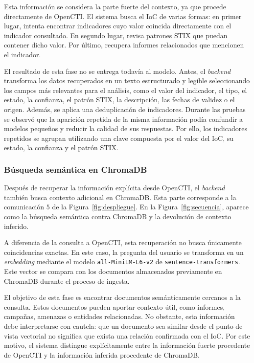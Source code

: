 \documentclass[12pt]{report}
\begin{document}
Esta información se considera la parte fuerte del contexto, ya que procede directamente de OpenCTI. El sistema busca el IoC de varias formas: en primer lugar, intenta encontrar indicadores cuyo valor coincida directamente con el indicador consultado. En segundo lugar, revisa patrones STIX que puedan contener dicho valor. Por último, recupera informes relacionados que mencionen el indicador.

El resultado de esta fase no se entrega todavía al modelo. Antes, el \textit{backend} transforma los datos recuperados en un texto estructurado y legible seleccionando los campos más relevantes para el análisis, como el valor del indicador, el tipo, el estado, la confianza, el patrón STIX, la descripción, las fechas de validez o el origen. Además, se aplica una deduplicación de indicadores. Durante las pruebas se observó que la aparición repetida de la misma información podía confundir a modelos pequeños y reducir la calidad de sus respuestas. Por ello, los indicadores repetidos se agrupan utilizando una clave compuesta por el valor del IoC, su estado, la confianza y el patrón STIX.

\subsubsection*{Búsqueda semántica en ChromaDB}

Después de recuperar la información explícita desde OpenCTI, el \textit{backend} también busca contexto adicional en ChromaDB. Esta parte corresponde a la comunicación $5$ de la Figura~\ref{fig:despliegue}. En la Figura~\ref{fig:secuencia}, aparece como la búsqueda semántica contra ChromaDB y la devolución de contexto inferido.

A diferencia de la consulta a OpenCTI, esta recuperación no busca únicamente coincidencias exactas. En este caso, la pregunta del usuario se transforma en un \textit{embedding} mediante el modelo \texttt{all-MiniLM-L6-v2} de \texttt{sentence-transformers}. Este vector se compara con los documentos almacenados previamente en ChromaDB durante el proceso de ingesta.

El objetivo de esta fase es encontrar documentos semánticamente cercanos a la consulta. Estos documentos pueden aportar contexto útil, como informes, campañas, amenazas o entidades relacionadas. No obstante, esta información debe interpretarse con cautela: que un documento sea similar desde el punto de vista vectorial no significa que exista una relación confirmada con el IoC. Por este motivo, el sistema distingue explícitamente entre la información fuerte procedente de OpenCTI y la información inferida procedente de ChromaDB.
\end{document}
